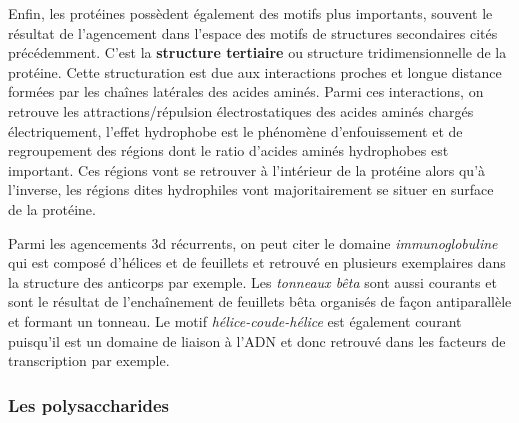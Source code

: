 Enfin, les protéines possèdent également des motifs plus importants, souvent le résultat de l'agencement dans l'espace des motifs de structures secondaires cités précédemment. C'est la \textbf{structure tertiaire} ou structure tridimensionnelle de la protéine. 
Cette structuration est due aux interactions proches et longue distance formées par les chaînes latérales des acides aminés. Parmi ces interactions, on retrouve les attractions/répulsion électrostatiques des acides aminés chargés électriquement, l'effet hydrophobe est le phénomène d'enfouissement et de regroupement des régions dont le ratio d'acides aminés hydrophobes est important. Ces régions vont se retrouver à l'intérieur de la protéine alors qu'à l'inverse, les régions dites hydrophiles vont majoritairement se situer en surface de la protéine.

Parmi les agencements 3d récurrents, on peut citer le domaine \textit{immunoglobuline} qui est composé d'hélices et de feuillets et retrouvé en plusieurs exemplaires dans la structure des anticorps par exemple. Les \textit{tonneaux bêta} sont aussi courants et sont le résultat de l’enchaînement de feuillets bêta organisés de façon antiparallèle et formant un tonneau. Le motif \textit{hélice-coude-hélice} est également courant puisqu'il est un domaine de liaison à l'ADN et donc retrouvé dans les facteurs de transcription par exemple.

\subsubsection{Les polysaccharides}

